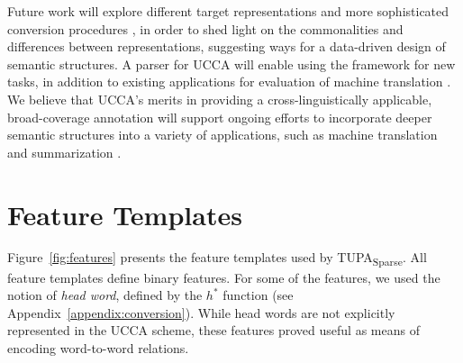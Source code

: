 \documentclass[11pt,a4paper]{article}
\newcommand{\parser}[1]{TUPA\textsubscript{#1}}
\newcommand{\figref}[1]{Figure~\ref{#1}}
\begin{document}
Future work will explore different target
representations and more sophisticated conversion procedures \cite{kong-15},
in order to shed light on the commonalities and differences between
representations, suggesting ways for a data-driven design of semantic structures.
A parser for UCCA will enable using the framework for new tasks,
in addition to existing applications for evaluation of
machine translation \cite{birch2016hume}.
We believe that UCCA's merits in providing a cross-linguistically applicable,
broad-coverage annotation will support ongoing efforts to incorporate deeper
semantic structures into a variety of applications,
such as machine translation \cite{jones2012semantics}
and summarization \cite{liu2015toward}.










\appendix
\section{Feature Templates}
\label{appendix:features}

\figref{fig:features} presents the feature templates used by \parser{Sparse}.
All feature templates define binary features.
For some of the features, we used the notion of \textit{head word},
defined by the $h^*$ function (see Appendix~\ref{appendix:conversion}).
While head words are not explicitly represented in the UCCA scheme, these
features proved useful as means of encoding word-to-word relations.
\end{document}
